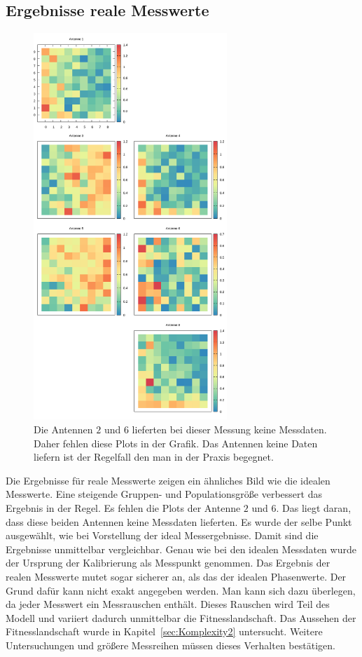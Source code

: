\subsection{Ergebnisse reale Messwerte}
%
\begin{figure}[h!]
	\centering
	\caption[Ergebnis-Heatmap - Messwerte]{Die Antennen $2$ und $6$ lieferten bei dieser Messung keine Messdaten. Daher fehlen diese Plots in der Grafik. Das Antennen keine Daten liefern ist der Regelfall den man in der Praxis begegnet. }
	\label{fig:results2}
	\includegraphics[width=0.65\textwidth]{img/resultRealData.png}
\end{figure}
%
Die Ergebnisse für reale Messwerte zeigen ein ähnliches Bild wie die idealen Messwerte. Eine steigende Gruppen- und Populationsgröße verbessert das Ergebnis in der Regel. Es fehlen die Plots der Antenne $2$ und $6$. Das liegt daran, dass diese beiden Antennen keine Messdaten lieferten. Es wurde der selbe Punkt ausgewählt, wie bei Vorstellung der ideal Messergebnisse. Damit sind die Ergebnisse unmittelbar vergleichbar. Genau wie bei den idealen Messdaten wurde der Ursprung der Kalibrierung als Messpunkt genommen. Das Ergebnis der realen Messwerte mutet sogar sicherer an, als das der idealen Phasenwerte. Der Grund dafür kann nicht exakt angegeben werden. Man kann sich dazu überlegen, da jeder Messwert ein Messrauschen enthält. Dieses Rauschen wird Teil des Modell und variiert dadurch unmittelbar die Fitnesslandschaft. Das Aussehen der Fitnesslandschaft wurde in Kapitel~\ref{sec:Komplexity2} untersucht. Weitere Untersuchungen und größere Messreihen müssen dieses Verhalten bestätigen. 
%
%
